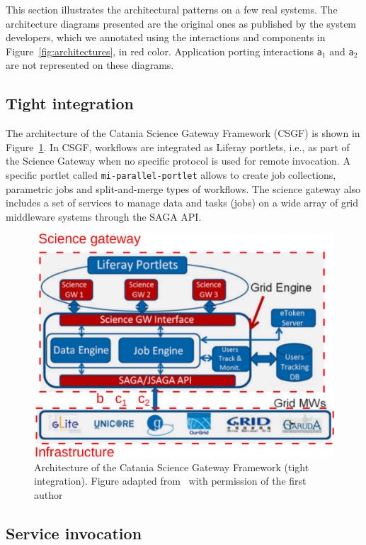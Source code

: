 \documentclass[preprint,3p,twocolumn]{elsarticle}
\newcommand{\todo}[2]{\pdfmargincomment[color=red,author=#1,open=true]{#2}}
\newcommand{\correction}[1]{\color{blue}#1\color{black}\xspace}
\begin{document}
\correction{This section illustrates the architectural patterns on a
  few real systems. The architecture diagrams presented are the
  original ones as published by the system developers, which we
  annotated using the interactions and components in
  Figure~\ref{fig:architectures}, in red color. Application porting
  interactions \texttt{a$_1$} and \texttt{a$_2$} are not represented
  on these diagrams.

\subsection{Tight integration}

The architecture of the Catania Science Gateway Framework (CSGF) is
shown in Figure~\ref{fig:csgf}. In CSGF, workflows are integrated as
Liferay portlets, i.e., as part of the Science Gateway when no
specific protocol is used for remote invocation. A specific portlet
called \texttt{mi-parallel-portlet} allows to create job collections,
parametric jobs and split-and-merge types of workflows. The science
gateway also includes a set of services to manage data and tasks
(jobs) on a wide array of grid middleware systems through the SAGA
API.
\begin{figure}
\centering
\includegraphics[width=\columnwidth]{figures/CSGF}
\caption{\correction{Architecture of the Catania Science Gateway Framework (tight
  integration). Figure adapted from~\cite{ardizzone2012decide} with
  permission of the first author} \todo{approval still pending}.}
\label{fig:csgf}
\end{figure}

\subsection{Service invocation}

}
\end{document}
